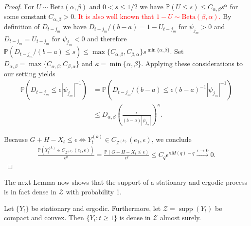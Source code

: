 \begin{proof}
    For $U\sim\text{Beta}(\alpha,\beta)$ and $0<s\le1/2$ we have $\mathbb{P}(U\le s)\le C_{\alpha,\beta} s^{\alpha}$ for some constant $C_{\alpha,\beta}>0$. \textcolor{red}{It is also well known that $1-U\sim\text{Beta}(\beta,\alpha)$.} By definition of $D_{t-j_m}$ we have $D_{t-j_m}/(b-a)=1-U_{t-j_m}$ for $\psi_{j_m}>0$ and $D_{t-j_m}=U_{t-j_m}$ for $\psi_{j_m}<0$ and therefore $\mathbb{P}(D_{t-j_m}/(b-a)\le s)\le\max\{C_{\alpha,\beta},C_{\beta,\alpha}\}s^{\min\{\alpha,\beta\}}$. Set $D_{\alpha,\beta}=\max\{C_{\alpha,\beta},C_{\beta,\alpha}\}$ and $\kappa=\min\{\alpha,\beta\}$. Applying these considerations to our setting yields
    \begin{align*}
        \mathbb{P}(D_{t-j_m}\le\epsilon|\psi_{j_m}|^{-1})&=\mathbb{P}(D_{t-j_m}/(b-a)\le\epsilon(b-a)^{-1}|\psi_{j_m}|^{-1})\\&
        \le D_{\alpha,\beta}\left(\frac{\epsilon}{(b-a)|\psi_{j_m}|}\right)^{\kappa}.
    \end{align*}
    
    Because $G+H-X_t\le\epsilon\iff Y_t^{(k)}\in C_{\mathcal{Z}^{(k)}}(e_1,\epsilon)$, we conclude
    \begin{align*}
        \frac{\mathbb{P}(Y_t^{(k)}\in C_{\mathcal{Z}^{(k)}}(e_1,\epsilon))}{\epsilon^q}=\frac{\mathbb{P}(G+H-X_t\le\epsilon)}{\epsilon^q}\le C_q\epsilon^{\kappa M(q)-q}\stackrel{\epsilon\to0}{\to}0.
    \end{align*}
\end{proof}

The next Lemma now shows that the support of a stationary and ergodic process is in fact dense in $\mathcal{Z}$ with probability 1. 

\begin{Lem}\label{lem:ergodic_implies_dense}
    Let $\{Y_t\}$ be stationary and ergodic. Furthermore, let $\mathcal{Z}=\operatorname{supp}(Y_t)$ be compact and convex. Then $\{Y_t:t\ge 1\}$ is dense in $\mathcal{Z}$ almost surely.
\end{Lem}

